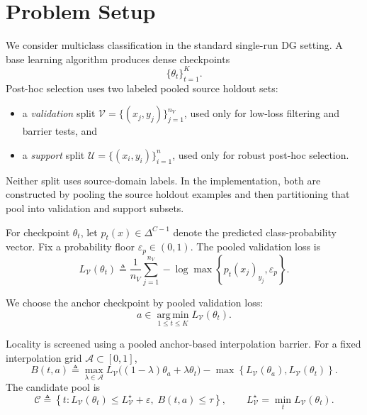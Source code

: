 \documentclass{article}
\newcommand{\cA}{\mathcal{A}}
\newcommand{\cC}{\mathcal{C}}
\newcommand{\cU}{\mathcal{U}}
\newcommand{\cV}{\mathcal{V}}
\newcommand{\argmin}{\operatorname*{arg\,min}}
\newcommand{\simplex}{\Delta}
\newcommand{\braces}[1]{\left\{ #1 \right\}}
\newcommand{\1}{\mathbbm{1}}
\begin{document}
\section{Problem Setup}
\label{sec:setup}

We consider multiclass classification in the standard single-run DG setting. A base learning algorithm produces dense checkpoints
\[
    \{\theta_t\}_{t=1}^{K}.
\]
Post-hoc selection uses two labeled pooled source holdout sets:
\begin{itemize}[leftmargin=1.4em]
    \item a \emph{validation} split \(\cV = \{(x_j,y_j)\}_{j=1}^{n_V}\), used only for low-loss filtering and barrier tests, and
    \item a \emph{support} split \(\cU = \{(x_i,y_i)\}_{i=1}^{n}\), used only for robust post-hoc selection.
\end{itemize}
Neither split uses source-domain labels. In the implementation, both are constructed by pooling the source holdout examples and then partitioning that pool into validation and support subsets.

For checkpoint \(\theta_t\), let \(p_t(x)\in\simplex^{C-1}\) denote the predicted class-probability vector. Fix a probability floor \(\varepsilon_p\in(0,1)\). The pooled validation loss is
\begin{equation}
    L_{\cV}(\theta_t)
    \triangleq
    \frac{1}{n_V}\sum_{j=1}^{n_V} -\log \max\braces{p_t(x_j)_{y_j}, \varepsilon_p}.
    \label{eq:val_loss}
\end{equation}

We choose the anchor checkpoint by pooled validation loss:
\begin{equation}
    a \in \argmin_{1\le t\le K} L_{\cV}(\theta_t).
    \label{eq:anchor}
\end{equation}

Locality is screened using a pooled anchor-based interpolation barrier. For a fixed interpolation grid \(\cA \subset [0,1]\),
\begin{equation}
    B(t,a)
    \triangleq
    \max_{\lambda\in \cA}
    L_{\cV}\big((1-\lambda)\theta_a + \lambda \theta_t\big)
    -
    \max\braces{L_{\cV}(\theta_a), L_{\cV}(\theta_t)}.
    \label{eq:barrier}
\end{equation}
The candidate pool is
\begin{equation}
    \cC
    \triangleq
    \braces{
        t :
        L_{\cV}(\theta_t)\le L_{\cV}^\star + \varepsilon,\;
        B(t,a)\le \tau
    },
    \qquad
    L_{\cV}^\star = \min_t L_{\cV}(\theta_t).
    \label{eq:candidate_pool}
\end{equation}
\end{document}
